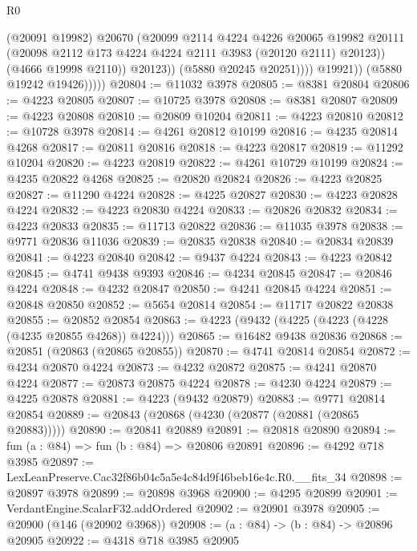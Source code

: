 \begin{lexlean}{R0}
\begin{coremodule}
                            (@20091 @19982)
                            @20670
                            (@20099
                              @2114
                              @4224
                              @4226
                              @20065
                              @19982
                              @20111
                              (@20098 @2112 @173 @4224 @4224 @2111 @3983 (@20120 @2111) @20123))
                            (@4666 @19998 @2110))
                          @20123))
                      (@5880 @20245 @20251))))
                @19921))
            (@5880 @19242 @19426)))))
@20804 := @11032 @3978
@20805 := @8381 @20804
@20806 := @4223 @20805
@20807 := @10725 @3978
@20808 := @8381 @20807
@20809 := @4223 @20808
@20810 := @20809 @10204
@20811 := @4223 @20810
@20812 := @10728 @3978
@20814 := @4261 @20812 @10199
@20816 := @4235 @20814 @4268
@20817 := @20811 @20816
@20818 := @4223 @20817
@20819 := @11292 @10204
@20820 := @4223 @20819
@20822 := @4261 @10729 @10199
@20824 := @4235 @20822 @4268
@20825 := @20820 @20824
@20826 := @4223 @20825
@20827 := @11290 @4224
@20828 := @4225 @20827
@20830 := @4223 @20828 @4224
@20832 := @4223 @20830 @4224
@20833 := @20826 @20832
@20834 := @4223 @20833
@20835 := @11713 @20822
@20836 := @11035 @3978
@20838 := @9771 @20836 @11036
@20839 := @20835 @20838
@20840 := @20834 @20839
@20841 := @4223 @20840
@20842 := @9437 @4224
@20843 := @4223 @20842
@20845 := @4741 @9438 @9393
@20846 := @4234 @20845
@20847 := @20846 @4224
@20848 := @4232 @20847
@20850 := @4241 @20845 @4224
@20851 := @20848 @20850
@20852 := @5654 @20814
@20854 := @11717 @20822 @20838
@20855 := @20852 @20854
@20863 := @4223 (@9432 (@4225 (@4223 (@4228 (@4235 @20855 @4268)) @4224)))
@20865 := @16482 @9438 @20836
@20868 := @20851 (@20863 (@20865 @20855))
@20870 := @4741 @20814 @20854
@20872 := @4234 @20870 @4224
@20873 := @4232 @20872
@20875 := @4241 @20870 @4224
@20877 := @20873 @20875 @4224
@20878 := @4230 @4224
@20879 := @4225 @20878
@20881 := @4223 (@9432 @20879)
@20883 := @9771 @20814 @20854
@20889 := @20843 (@20868 (@4230 (@20877 (@20881 (@20865 @20883)))))
@20890 := @20841 @20889
@20891 := @20818 @20890
@20894 := fun (a : @84) => fun (b : @84) => @20806 @20891
@20896 := @4292 @718 @3985
@20897 := LexLeanPreserve.Cac32f86b04c5a5e4c84d9f46beb16e4c.R0.__fits_34
@20898 := @20897 @3978
@20899 := @20898 @3968
@20900 := @4295 @20899
@20901 := VerdantEngine.ScalarF32.addOrdered
@20902 := @20901 @3978
@20905 := @20900 (@146 (@20902 @3968))
@20908 := (a : @84) -> (b : @84) -> @20896 @20905
@20922 := @4318
    @718
    @3985
    @20905

\end{coremodule}
\end{lexlean}
